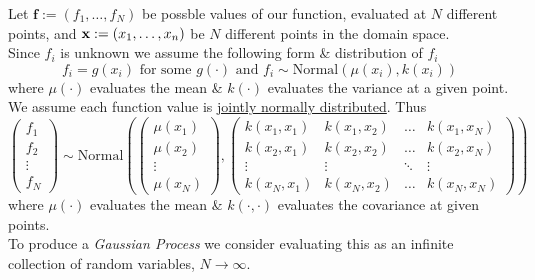 \documentclass[11pt,a4paper]{article}
\begin{document}
Let $\textbf{f}:=(f_1,\dots,f_N)$ be possble values of our function, evaluated at $N$ different points, and $\textbf{x}:=(x_1,\dots,x_n)$ be $N$ different points in the domain space.\\
Since $f_i$ is unknown we assume the following form \& distribution of $f_i$
$$f_i=g(x_i)\text{ for some }g(\cdot)\text{ and }f_i\sim\text{Normal}(\mu(x_i),k(x_i))$$
where $\mu(\cdot)$ evaluates the mean \& $k(\cdot)$ evaluates the variance at a given point.\\
We assume each function value is \underline{jointly normally distributed}. Thus
$$\begin{pmatrix}f_1\\f_2\\\vdots\\f_N\end{pmatrix}\sim\text{Normal}\left(\begin{pmatrix}\mu(x_1)\\\mu(x_2)\\\vdots\\\mu(x_N)\end{pmatrix},\begin{pmatrix}k(x_1,x_1)&k(x_1,x_2)&\dots&k(x_1,x_N)\\k(x_2,x_1)&k(x_2,x_2)&\dots&k(x_2,x_N)\\\vdots&\vdots&\ddots&\vdots\\k(x_N,x_1)&k(x_N,x_2)&\dots&k(x_N,x_N)\end{pmatrix}\right)$$
where $\mu(\cdot)$ evaluates the mean \& $k(\cdot,\cdot)$ evaluates the covariance at given points.\\
To produce a \textit{Gaussian Process} we consider evaluating this as an infinite collection of random variables, \ie $N\to\infty$.\\
\end{document}
